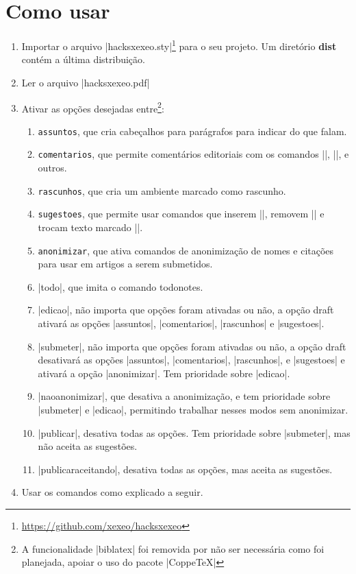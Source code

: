 \documentclass{article}
\begin{document}
    \section{Como usar}
    
    \begin{enumerate}
        \item Importar o arquivo |hacksxexeo.sty|\footnote{\url{https://github.com/xexeo/hacksxexeo}} para o seu  projeto. 
        Um diretório \textbf{dist} contém a última distribuição.
        \item Ler o arquivo |hacksxexeo.pdf|
        \item Ativar as opções desejadas entre\footnote{A funcionalidade |biblatex| foi removida por não ser necessária como foi planejada, apoiar o uso do pacote |CoppeTeX|}:
        \begin{enumerate}
            \item \verb!assuntos!, que cria cabeçalhos para parágrafos para indicar do que falam.
            \item \verb!comentarios!, que permite comentários editoriais com os comandos |\cand{}|, |\candr|, e outros.
            \item \verb!rascunhos!, que cria um ambiente marcado como rascunho.
            \item \verb!sugestoes!, que permite usar comandos que inserem |\candsug|, removem |\candrem| e trocam texto marcado |\candtroca|.
            \item \verb!anonimizar!, que ativa comandos de anonimização de nomes e citações para usar em artigos a serem submetidos.
            \item |todo|, que imita o comando todonotes.
            \item |edicao|, não importa que opções foram ativadas ou não, a opção draft ativará as opções |assuntos|, |comentarios|, |rascunhos| e |sugestoes|.
            \item |submeter|, não importa que opções foram ativadas ou não, a opção draft desativará as opções |assuntos|, |comentarios|, |rascunhos|, e |sugestoes| e ativará a opção |anonimizar|. Tem prioridade sobre |edicao|.
            \item |naoanonimizar|, que desativa a anonimização, e tem prioridade sobre |submeter| e |edicao|, permitindo trabalhar nesses modos sem anonimizar. 
            \item |publicar|, desativa todas as opções.  Tem prioridade sobre |submeter|, mas não aceita as sugestões.
            \item |publicaraceitando|, desativa todas as opções, mas aceita as sugestões.
        \end{enumerate}
        \item Usar os comandos como explicado a seguir.
    \end{enumerate}
    
\end{document}
